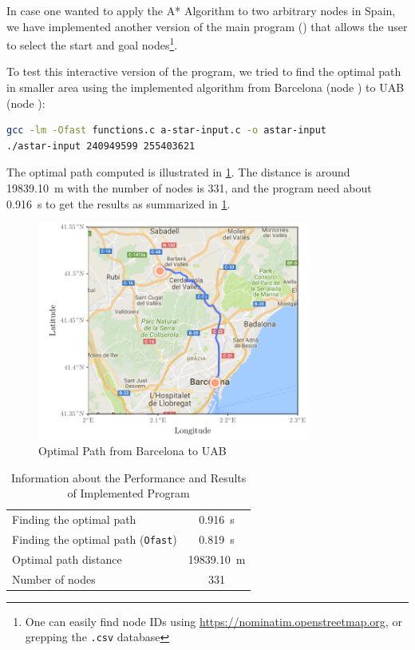 In case one wanted to apply the A* Algorithm to two arbitrary nodes in Spain, we have implemented another version of the main program () that allows the user to select the start and goal nodes\footnote{One can easily find node IDs using \url{https://nominatim.openstreetmap.org}, or grepping the \texttt{.csv} database}. 

To test this interactive version of the program, we tried to find the optimal path in smaller area using the implemented algorithm from Barcelona (node ) to UAB (node ):
\begin{lstlisting}[language=bash]
gcc -lm -Ofast functions.c a-star-input.c -o astar-input
./astar-input 240949599 255403621
\end{lstlisting}

The optimal path computed is illustrated in \cref{fig:bcntouab}. The distance is around \SI{19839.10}{\m} with the number of nodes is \num{331}, and the program need about \SI{0.916}{\s} to get the results as summarized in \cref{tab:results-uab}.

\begin{figure}[H]
    \centering
    \includegraphics[width=0.8\textwidth]{images/solution-uab}
    \caption{Optimal Path from Barcelona to UAB}
    \label{fig:bcntouab}
\end{figure}


\begin{table}[H]
  \centering
  \begin{tabular}{l c}
      \toprule
      \toprule
      Finding the optimal path                  & \SI{0.916}{\s} \\
      Finding the optimal path (\texttt{Ofast}) & \SI{0.819}{\s} \\
      \midrule
      Optimal path distance    & \SI{19839.10}{\m} \\
      Number of nodes          & \num{331} \\
      \bottomrule
  \end{tabular}
  \caption{Information about the Performance and Results of Implemented Program}
  \label{tab:results-uab}
\end{table}

